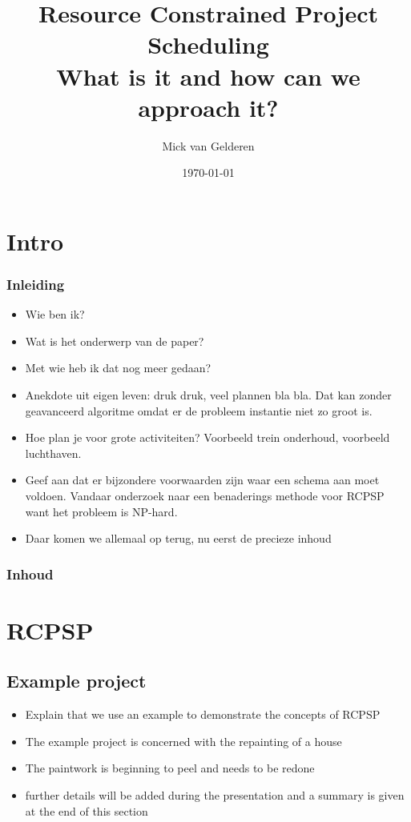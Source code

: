 \documentclass{beamer}
\title[RCPS]{Resource Constrained Project Scheduling\\
What is it and how can we approach it?}
\author{Mick van Gelderen}
\institute{TU Delft}
\date{\today}
\theoremstyle{definition}
\begin{document}
\begin{frame}
\titlepage
\end{frame}

\section*{Intro}
\begin{frame}
    \frametitle{Inleiding}
    \begin{itemize}
        \item Wie ben ik?
        \item Wat is het onderwerp van de paper?
        \item Met wie heb ik dat nog meer gedaan?
        \item Anekdote uit eigen leven: druk druk, veel plannen bla bla. Dat kan zonder geavanceerd algoritme omdat er de probleem instantie niet zo groot is. 
        \item Hoe plan je voor grote activiteiten? Voorbeeld trein onderhoud, voorbeeld luchthaven. 
        \item Geef aan dat er bijzondere voorwaarden zijn waar een schema aan moet voldoen.  Vandaar onderzoek naar een benaderings methode voor  RCPSP want het probleem is NP-hard. 
        \item Daar komen we allemaal op terug, nu eerst de precieze inhoud
    \end{itemize}
\end{frame}

\begin{frame}
    \frametitle{Inhoud}
    \tableofcontents
\end{frame}

\section{RCPSP}

\subsection{Example project}
\begin{frame}
	\begin{itemize}
		\item Explain that we use an example to demonstrate the concepts of RCPSP
		\item The example project is concerned with the repainting of a house
		\item The paintwork is beginning to peel and needs to be redone
		\item further details will be added during the presentation and a summary is given at the end of this section
	\end{itemize}
\end{frame}
\end{document}
